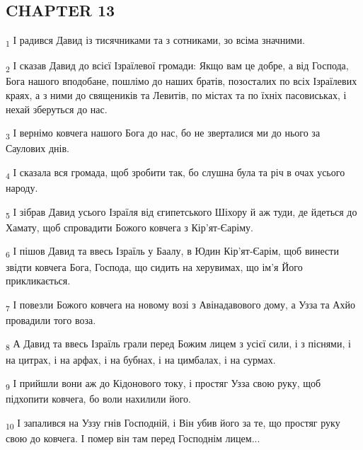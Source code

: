 \subsection{CHAPTER 13}
\begin{tcolorbox}
\textsubscript{1} І радився Давид із тисячниками та з сотниками, зо всіма значними.
\end{tcolorbox}
\begin{tcolorbox}
\textsubscript{2} І сказав Давид до всієї Ізраїлевої громади: Якщо вам це добре, а від Господа, Бога нашого вподобане, пошлімо до наших братів, позосталих по всіх Ізраїлевих краях, а з ними до священиків та Левитів, по містах та по їхніх пасовиськах, і нехай зберуться до нас.
\end{tcolorbox}
\begin{tcolorbox}
\textsubscript{3} І вернімо ковчега нашого Бога до нас, бо не зверталися ми до нього за Саулових днів.
\end{tcolorbox}
\begin{tcolorbox}
\textsubscript{4} І сказала вся громада, щоб зробити так, бо слушна була та річ в очах усього народу.
\end{tcolorbox}
\begin{tcolorbox}
\textsubscript{5} І зібрав Давид усього Ізраїля від єгипетського Шіхору й аж туди, де йдеться до Хамату, щоб спровадити Божого ковчега з Кір'ят-Єаріму.
\end{tcolorbox}
\begin{tcolorbox}
\textsubscript{6} І пішов Давид та ввесь Ізраїль у Баалу, в Юдин Кір'ят-Єарім, щоб винести звідти ковчега Бога, Господа, що сидить на херувимах, що ім'я Його прикликається.
\end{tcolorbox}
\begin{tcolorbox}
\textsubscript{7} І повезли Божого ковчега на новому возі з Авінадавового дому, а Узза та Ахйо провадили того воза.
\end{tcolorbox}
\begin{tcolorbox}
\textsubscript{8} А Давид та ввесь Ізраїль грали перед Божим лицем з усієї сили, і з піснями, і на цитрах, і на арфах, і на бубнах, і на цимбалах, і на сурмах.
\end{tcolorbox}
\begin{tcolorbox}
\textsubscript{9} І прийшли вони аж до Кідонового току, і простяг Узза свою руку, щоб підхопити ковчега, бо воли нахилили його.
\end{tcolorbox}
\begin{tcolorbox}
\textsubscript{10} І запалився на Уззу гнів Господній, і Він убив його за те, що простяг руку свою до ковчега. І помер він там перед Господнім лицем...
\end{tcolorbox}
